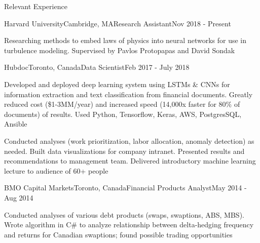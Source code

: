 \documentclass{resume} %
\begin{document}
\begin{rSection}{Relevant Experience}

\begin{rSubsection}{Harvard University}{Cambridge, MA}{Research Assistant}{Nov 2018 - Present}
\item Researching methods to embed laws of physics into neural networks for use in turbulence modeling. Supervised by Pavlos Protopapas and David Sondak
\end{rSubsection}


\begin{rSubsection}{Hubdoc}{Toronto, Canada}{Data Scientist}{Feb 2017 - July 2018}
\item Developed and deployed deep learning system using LSTMs \& CNNs for information extraction and text classification from financial documents. Greatly reduced cost (\$1-3MM/year) and increased speed (14,000x faster for 80\% of documents) of results. Used Python, Tensorflow, Keras, AWS, PostgresSQL, Ansible
\item Conducted analyses (work prioritization, labor allocation, anomaly detection) as needed. Built data visualizations for company intranet. Presented results and recommendations to management team. Delivered introductory machine learning lecture to audience of 60+ people
\end{rSubsection}


\begin{rSubsection}{BMO Capital Markets}{Toronto, Canada}{Financial Products Analyst}{May 2014 - Aug 2014}
\item Conducted analyses of various debt products (swaps, swaptions, ABS, MBS). Wrote algorithm in C\# to analyze relationship between delta-hedging frequency and returns for Canadian swaptions; found possible trading opportunities
\end{rSubsection}

\end{rSection}

\end{document}
